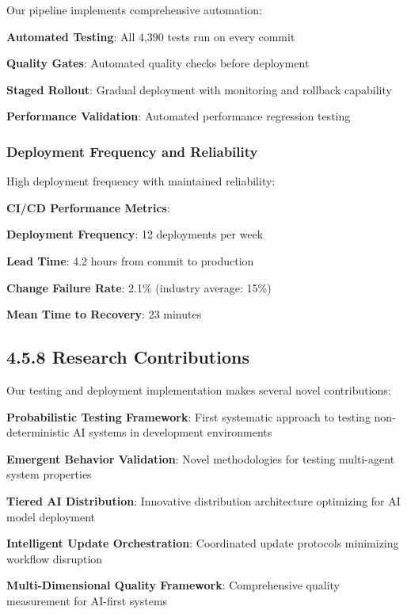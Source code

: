 Our pipeline implements comprehensive automation:

\begin{compactlist}
    \item \textbf{Automated Testing}: All 4,390 tests run on every commit
    \item \textbf{Quality Gates}: Automated quality checks before deployment
    \item \textbf{Staged Rollout}: Gradual deployment with monitoring and rollback capability
    \item \textbf{Performance Validation}: Automated performance regression testing
\end{compactlist}

\subsubsection*{Deployment Frequency and Reliability}

High deployment frequency with maintained reliability:

\begin{successbox}
\textbf{CI/CD Performance Metrics}:
\begin{compactlist}
    \item \textbf{Deployment Frequency}: 12 deployments per week
    \item \textbf{Lead Time}: 4.2 hours from commit to production
    \item \textbf{Change Failure Rate}: 2.1\% (industry average: 15\%)
    \item \textbf{Mean Time to Recovery}: 23 minutes
\end{compactlist}
\end{successbox}

\subsection*{4.5.8 Research Contributions}
\label{subsec:testing-deployment-contributions}

Our testing and deployment implementation makes several novel contributions:

\begin{expandedlist}
    \item \textbf{Probabilistic Testing Framework}: First systematic approach to testing non-deterministic AI systems in development environments
    \item \textbf{Emergent Behavior Validation}: Novel methodologies for testing multi-agent system properties
    \item \textbf{Tiered AI Distribution}: Innovative distribution architecture optimizing for AI model deployment
    \item \textbf{Intelligent Update Orchestration}: Coordinated update protocols minimizing workflow disruption
    \item \textbf{Multi-Dimensional Quality Framework}: Comprehensive quality measurement for AI-first systems
\end{expandedlist}

